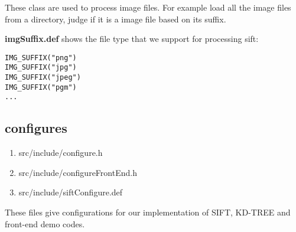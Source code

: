 \documentclass[paper=a4, fontsize=11pt]{scrartcl} %
\numberwithin{equation}{section} %
\numberwithin{figure}{section} %
\numberwithin{table}{section} %
\begin{document}
These class are used to process image files. For example load all the image files from a directory, judge if it is a image file based on its suffix.

\textbf{imgSuffix.def} shows the file type that we support for processing sift:

\begin{lstlisting}
IMG_SUFFIX("png")
IMG_SUFFIX("jpg")
IMG_SUFFIX("jpeg")
IMG_SUFFIX("pgm")
...
\end{lstlisting}


\subsection{configures}\label{sec-configure}

\begin{enumerate}
    \item src/include/configure.h
    \item src/include/configureFrontEnd.h
    \item src/include/siftConfigure.def
\end{enumerate}

These files give configurations for our implementation of SIFT, KD-TREE and front-end demo codes.



\end{document}
